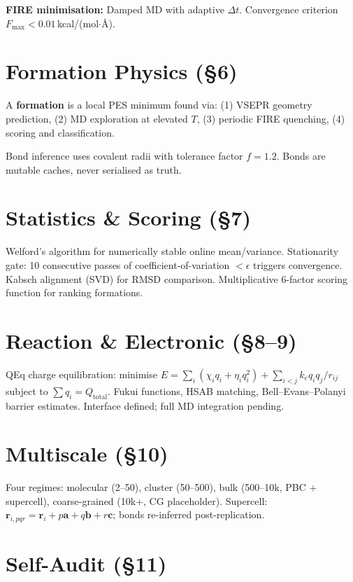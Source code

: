 \documentclass[10pt, a4paper, twocolumn]{article}
\begin{document}
\textbf{FIRE minimisation:} Damped MD with adaptive $\Delta t$.
Convergence criterion $F_\text{max} < 0.01$\,kcal/(mol$\cdot${\AA}).

\section{Formation Physics (\S6)}

A \textbf{formation} is a local PES minimum found via:
(1) VSEPR geometry prediction,
(2) MD exploration at elevated $T$,
(3) periodic FIRE quenching,
(4) scoring and classification.

Bond inference uses covalent radii with tolerance factor $f=1.2$.
Bonds are mutable caches, never serialised as truth.

\section{Statistics \& Scoring (\S7)}

Welford's algorithm for numerically stable online mean/variance.
Stationarity gate: 10 consecutive passes of coefficient-of-variation
$< \epsilon$ triggers convergence.
Kabsch alignment (SVD) for RMSD comparison.
Multiplicative 6-factor scoring function for ranking formations.

\section{Reaction \& Electronic (\S8--9)}

QEq charge equilibration: minimise
$E = \sum_i(\chi_i q_i + \eta_i q_i^2) + \sum_{i<j} k_e q_i q_j / r_{ij}$
subject to $\sum q_i = Q_\text{total}$.
Fukui functions, HSAB matching, Bell--Evans--Polanyi barrier
estimates.  Interface defined; full MD integration pending.

\section{Multiscale (\S10)}

Four regimes: molecular (2--50), cluster (50--500), bulk
(500--10k, PBC + supercell), coarse-grained (10k+, CG placeholder).
Supercell: $\mathbf{r}_{i,pqr} = \mathbf{r}_i + p\mathbf{a} +
q\mathbf{b} + r\mathbf{c}$; bonds re-inferred post-replication.

\section{Self-Audit (\S11)}
\end{document}
